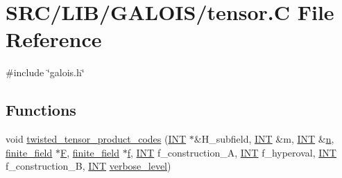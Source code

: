 \hypertarget{tensor_8_c}{}\section{S\+R\+C/\+L\+I\+B/\+G\+A\+L\+O\+I\+S/tensor.C File Reference}
\label{tensor_8_c}
{\ttfamily \#include \char`\"{}galois.\+h\char`\"{}}\newline
\subsection*{Functions}
\begin{DoxyCompactItemize}
\item 
void \mbox{\hyperlink{tensor_8_c_adc92206fd9c137be57386b30cc834f7e}{twisted\+\_\+tensor\+\_\+product\+\_\+codes}} (\mbox{\hyperlink{galois_8h_a09fddde158a3a20bd2dcadb609de11dc}{I\+NT}} $\ast$\&H\+\_\+subfield, \mbox{\hyperlink{galois_8h_a09fddde158a3a20bd2dcadb609de11dc}{I\+NT}} \&m, \mbox{\hyperlink{galois_8h_a09fddde158a3a20bd2dcadb609de11dc}{I\+NT}} \&\mbox{\hyperlink{simeon_8_c_a7f2cd26777ce0ff3fdaf8d02aacbddfb}{n}}, \mbox{\hyperlink{classfinite__field}{finite\+\_\+field}} $\ast$\mbox{\hyperlink{simeon_8_c_a21a61c535ff7d9d4b674461d3b19fffa}{F}}, \mbox{\hyperlink{classfinite__field}{finite\+\_\+field}} $\ast$\mbox{\hyperlink{alphabet2_8_c_a362077c979b0bb65159c603270e40f70}{f}}, \mbox{\hyperlink{galois_8h_a09fddde158a3a20bd2dcadb609de11dc}{I\+NT}} f\+\_\+construction\+\_\+A, \mbox{\hyperlink{galois_8h_a09fddde158a3a20bd2dcadb609de11dc}{I\+NT}} f\+\_\+hyperoval, \mbox{\hyperlink{galois_8h_a09fddde158a3a20bd2dcadb609de11dc}{I\+NT}} f\+\_\+construction\+\_\+B, \mbox{\hyperlink{galois_8h_a09fddde158a3a20bd2dcadb609de11dc}{I\+NT}} \mbox{\hyperlink{simeon_8_c_a818073fbcc2f439e7c56952f67386122}{verbose\+\_\+level}})
\item 

\end{DoxyCompactItemize}
